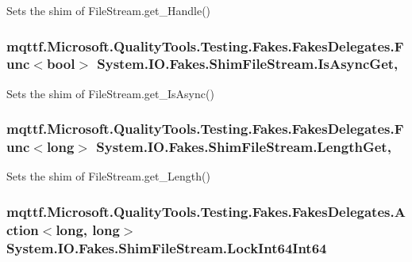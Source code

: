 Sets the shim of File\-Stream.\-get\-\_\-\-Handle()

\hypertarget{class_system_1_1_i_o_1_1_fakes_1_1_shim_file_stream_ac418fc0c719af04e0e81bcda81c4fd2a}{
\subsubsection[{Is\-Async\-Get}]{\setlength{\rightskip}{0pt plus 5cm}mqttf.\-Microsoft.\-Quality\-Tools.\-Testing.\-Fakes.\-Fakes\-Delegates.\-Func$<$bool$>$ System.\-I\-O.\-Fakes.\-Shim\-File\-Stream.\-Is\-Async\-Get\hspace{0.3cm}{\ttfamily [get]}, {\ttfamily [set]}}}\label{class_system_1_1_i_o_1_1_fakes_1_1_shim_file_stream_ac418fc0c719af04e0e81bcda81c4fd2a}


Sets the shim of File\-Stream.\-get\-\_\-\-Is\-Async()

\hypertarget{class_system_1_1_i_o_1_1_fakes_1_1_shim_file_stream_a98a9acadd3e4cbab8951e7d6e5469a85}{
\subsubsection[{Length\-Get}]{\setlength{\rightskip}{0pt plus 5cm}mqttf.\-Microsoft.\-Quality\-Tools.\-Testing.\-Fakes.\-Fakes\-Delegates.\-Func$<$long$>$ System.\-I\-O.\-Fakes.\-Shim\-File\-Stream.\-Length\-Get\hspace{0.3cm}{\ttfamily [get]}, {\ttfamily [set]}}}\label{class_system_1_1_i_o_1_1_fakes_1_1_shim_file_stream_a98a9acadd3e4cbab8951e7d6e5469a85}


Sets the shim of File\-Stream.\-get\-\_\-\-Length()

\hypertarget{class_system_1_1_i_o_1_1_fakes_1_1_shim_file_stream_aa183af382ac41f7d23405ce2731515e7}{
\subsubsection[{Lock\-Int64\-Int64}]{\setlength{\rightskip}{0pt plus 5cm}mqttf.\-Microsoft.\-Quality\-Tools.\-Testing.\-Fakes.\-Fakes\-Delegates.\-Action$<$long, long$>$ System.\-I\-O.\-Fakes.\-Shim\-File\-Stream.\-Lock\-Int64\-Int64\hspace{0.3cm}{\ttfamily [set]}}}\label{class_system_1_1_i_o_1_1_fakes_1_1_shim_file_stream_aa183af382ac41f7d23405ce2731515e7}


